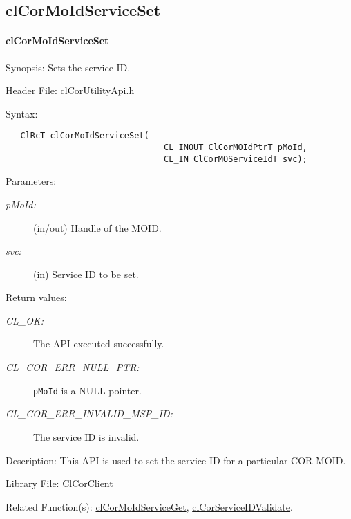\begin{flushleft}
\subsection{clCorMoIdServiceSet}
\hypertarget{pagecor130}{}\paragraph{cl\-Cor\-MoId\-Service\-Set}\label{pagecor130}
\begin{Desc}
\item[Synopsis:]Sets the service ID.\end{Desc}
\begin{Desc}
\item[Header File:]clCorUtilityApi.h\end{Desc}
\begin{Desc}
\item[Syntax:]

\footnotesize\begin{verbatim}   ClRcT clCorMoIdServiceSet(
                         		CL_INOUT ClCorMOIdPtrT pMoId,
                         		CL_IN ClCorMOServiceIdT svc);
\end{verbatim}
\normalsize
\end{Desc}
\begin{Desc}
\item[Parameters:]
\begin{description}
\item[{\em p\-MoId:}](in/out) Handle of the MOID. \item[{\em svc:}](in) Service ID to be set.\end{description}
\end{Desc}
\begin{Desc}
\item[Return values:]
\begin{description}
\item[{\em CL\_\-OK:}]The API executed successfully.
\item[{\em CL\_\-COR\_\-ERR\_\-NULL\_\-PTR:}] {\tt{pMoId}} is a NULL pointer.
\item[{\em CL\_\-COR\_\-ERR\_\-INVALID\_\-MSP\_\-ID:}] The service ID is invalid.

\end{description}
\end{Desc}
\begin{Desc}
\item[Description:]This API is used to set the service ID for a particular COR MOID.\end{Desc}
\begin{Desc}
\item[Library File:]Cl\-Cor\-Client\end{Desc}
\begin{Desc}
\item[Related Function(s):]\hyperlink{pagecor129}{cl\-Cor\-MoId\-Service\-Get}, \hyperlink{pagecor248}{cl\-Cor\-Service\-ID\-Validate}. \end{Desc}
\newpage



\end{flushleft}
